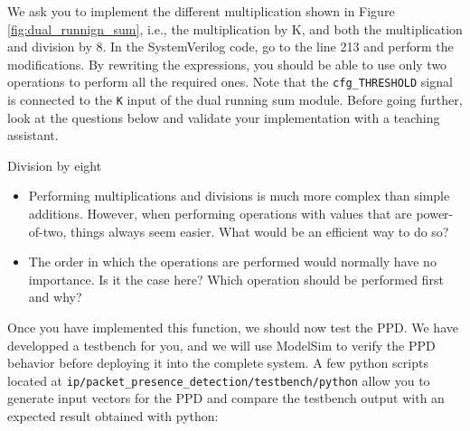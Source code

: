 We ask you to implement the different multiplication shown in Figure \ref{fig:dual_runnign_sum}, i.e., the multiplication by K, and both the multiplication and division by 8. In the SystemVerilog code, go to the line 213 and perform the modifications. By rewriting the expressions, you should be able to use only two operations to perform all the required ones. Note that the \texttt{cfg\_THRESHOLD} signal is connected to the \texttt{K} input of the dual running sum module. Before going further, look at the questions below and validate your implementation with a teaching assistant.


\begin{bclogo}[couleur = gray!20, arrondi = 0.2, logo=\bcquestion]{Division by eight}
    \begin{itemize}
        \item Performing multiplications and divisions is much more complex than simple additions. However, when performing operations with values that are power-of-two, things always seem easier. What would be an efficient way to do so?
        \item The order in which the operations are performed would normally have no importance. Is it the case here? Which operation should be performed first and why?
    \end{itemize}
\end{bclogo}

Once you have implemented this function, we should now test the PPD. We have developped a testbench for you, and we will use ModelSim to verify the PPD behavior before deploying it into the complete system. A few python scripts located at \texttt{ip/packet\_presence\_detection/testbench/python} allow you to generate input vectors for the PPD and compare the testbench output with an expected result obtained with python:

